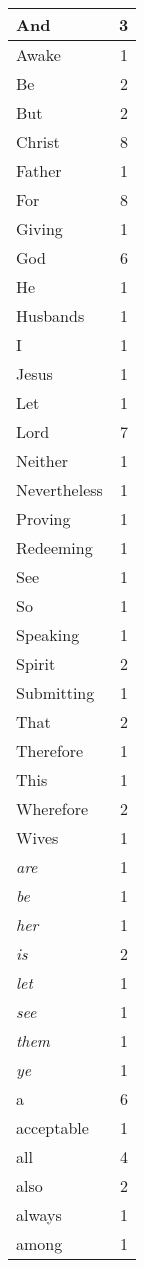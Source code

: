 \begin{center}
\begin{longtable}{l|r}
And & 3\\ \hline 
Awake & 1\\ \hline 
Be & 2\\ \hline 
But & 2\\ \hline 
Christ & 8\\ \hline 
Father & 1\\ \hline 
For & 8\\ \hline 
Giving & 1\\ \hline 
God & 6\\ \hline 
He & 1\\ \hline 
Husbands & 1\\ \hline 
I & 1\\ \hline 
Jesus & 1\\ \hline 
Let & 1\\ \hline 
Lord & 7\\ \hline 
Neither & 1\\ \hline 
Nevertheless & 1\\ \hline 
Proving & 1\\ \hline 
Redeeming & 1\\ \hline 
See & 1\\ \hline 
So & 1\\ \hline 
Speaking & 1\\ \hline 
Spirit & 2\\ \hline 
Submitting & 1\\ \hline 
That & 2\\ \hline 
Therefore & 1\\ \hline 
This & 1\\ \hline 
Wherefore & 2\\ \hline 
Wives & 1\\ \hline 
\emph{are} & 1\\ \hline 
\emph{be} & 1\\ \hline 
\emph{her} & 1\\ \hline 
\emph{is} & 2\\ \hline 
\emph{let} & 1\\ \hline 
\emph{see} & 1\\ \hline 
\emph{them} & 1\\ \hline 
\emph{ye} & 1\\ \hline 
a & 6\\ \hline 
acceptable & 1\\ \hline 
all & 4\\ \hline 
also & 2\\ \hline 
always & 1\\ \hline 
among & 1\\ \hline 

\end{longtable}
\end{center}

